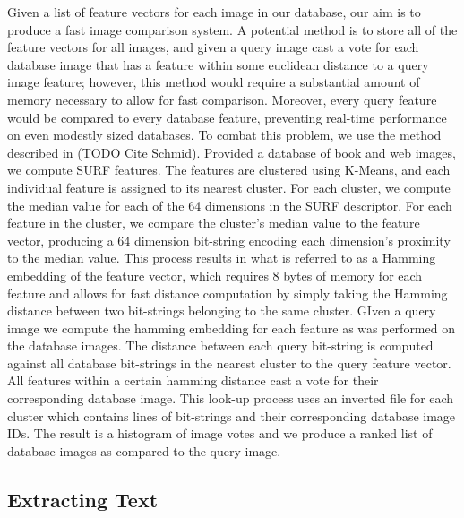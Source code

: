 \documentclass{www2010-submission}
\begin{document}
Given a list of feature vectors for each image in our database, our
aim is to produce a fast image comparison system.  A potential method
is to store all of the feature vectors for all images, and given a
query image cast a vote for each database image that has a feature
within some euclidean distance to a query image feature; however, this
method would require a substantial amount of memory necessary to allow
for fast comparison.  Moreover, every query feature would be compared
to every database feature, preventing real-time performance on even
modestly sized databases.  To combat this problem, we use the method
described in (TODO Cite Schmid).  Provided a database of book and web
images, we compute SURF features. The features are clustered using
K-Means, and each individual feature is assigned to its nearest
cluster.  For each cluster, we compute the median value for each of
the 64 dimensions in the SURF descriptor.  For each feature in the
cluster, we compare the cluster's median value to the feature vector,
producing a 64 dimension bit-string encoding each dimension's
proximity to the median value.  This process results in what is
referred to as a Hamming embedding of the feature vector, which
requires 8 bytes of memory for each feature and allows for fast
distance computation by simply taking the Hamming distance between two
bit-strings belonging to the same cluster.  GIven a query image we
compute the hamming embedding for each feature as was performed on the
database images.  The distance between each query bit-string is
computed against all database bit-strings in the nearest cluster to
the query feature vector.  All features within a certain hamming
distance cast a vote for their corresponding database image.  This
look-up process uses an inverted file for each cluster which contains
lines of bit-strings and their corresponding database image IDs.  The
result is a histogram of image votes and we produce a ranked list of
database images as compared to the query image.




\subsection{Extracting Text}
\end{document}
